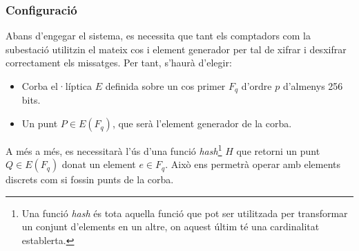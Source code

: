 \documentclass{article}
\begin{document}
\subsubsection{Configuració}\label{sec:configuracio-recsi}
Abans d'engegar el sistema, es necessita que tant els comptadors com la subestació utilitzin el mateix cos i element generador per tal de xifrar i desxifrar correctament els missatges. Per tant, s'haurà d'elegir:
\begin{itemize}
	\item Corba el·líptica $E$ definida sobre un cos primer $F_q$ d'ordre $p$ d'almenys 256 bits.
	\item Un punt $P \in E(F_q)$, que serà l'element generador de la corba.
\end{itemize}
A més a més, es necessitarà l'ús d'una funció \textit{hash}\footnote{
Una funció \textit{hash} és tota aquella funció que pot ser utilitzada per transformar un conjunt d'elements en un altre, on aquest últim té una cardinalitat establerta.
}
$H$ que retorni un punt $Q \in E(F_q)$ donat un element $e \in F_q$. Això ens permetrà operar amb elements discrets com si fossin punts de la corba. 
\end{document}
